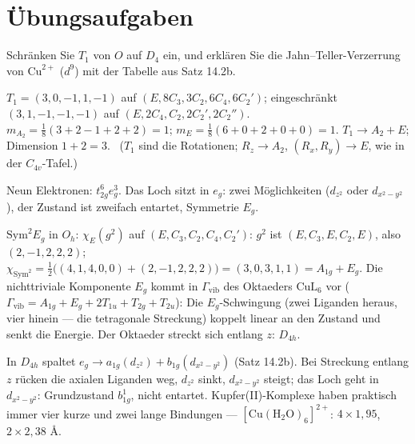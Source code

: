 \section{Übungsaufgaben}

\begin{aufgabe}
Schränken Sie $T_1$ von $O$ auf $D_4$ ein, und erklären Sie die Jahn--Teller-Verzerrung von $\mathrm{Cu}^{2+}$ ($d^{9}$) mit der Tabelle aus Satz 14.2b.

\loesung
{}
$T_1 = (3, 0, -1, 1, -1)$ auf $(E, 8C_3, 3C_2, 6C_4, 6C_2')$; eingeschränkt $(3, 1, -1, -1, -1)$ auf $(E, 2C_4, C_2, 2C_2', 2C_2'')$. $m_{A_2} = \frac18(3 + 2 - 1 + 2 + 2) = 1$; $m_E = \frac18(6 + 0 + 2 + 0 + 0) = 1$. $T_1\to A_2 + E$; Dimension $1 + 2 = 3$. \checkmark\ ($T_1$ sind die Rotationen; $R_z\to A_2$, $(R_x, R_y)\to E$, wie in der $C_{4v}$-Tafel.)

Neun Elektronen: $t_{2g}^{6}e_g^{3}$. Das Loch sitzt in $e_g$: zwei Möglichkeiten ($d_{z^{2}}$ oder $d_{x^{2}-y^{2}}$), der Zustand ist zweifach entartet, Symmetrie $E_g$.

$\mathrm{Sym}^{2}E_g$ in $O_h$: $\chi_E(g^{2})$ auf $(E, C_3, C_2, C_4, C_2')$: $g^{2}$ ist $(E, C_3, E, C_2, E)$, also $(2, -1, 2, 2, 2)$; $\chi_{\mathrm{Sym}^{2}} = \frac12\bigl((4, 1, 4, 0, 0) + (2, -1, 2, 2, 2)\bigr) = (3, 0, 3, 1, 1) = A_{1g} + E_g$. Die nichttriviale Komponente $E_g$ kommt in $\Gamma_{\mathrm{vib}}$ des Oktaeders $\mathrm{CuL_6}$ vor ($\Gamma_{\mathrm{vib}} = A_{1g} + E_g + 2T_{1u} + T_{2g} + T_{2u}$): Die $E_g$-Schwingung (zwei Liganden heraus, vier hinein --- die tetragonale Streckung) koppelt linear an den Zustand und senkt die Energie. Der Oktaeder streckt sich entlang $z$: $D_{4h}$.

In $D_{4h}$ spaltet $e_g\to a_{1g}(d_{z^{2}}) + b_{1g}(d_{x^{2}-y^{2}})$ (Satz 14.2b). Bei Streckung entlang $z$ rücken die axialen Liganden weg, $d_{z^{2}}$ sinkt, $d_{x^{2}-y^{2}}$ steigt; das Loch geht in $d_{x^{2}-y^{2}}$: Grundzustand $b_{1g}^{1}$, nicht entartet. Kupfer(II)-Komplexe haben praktisch immer vier kurze und zwei lange Bindungen --- $[\mathrm{Cu(H_2O)_6}]^{2+}$: $4\times1{,}95$, $2\times2{,}38$ \AA.


\end{aufgabe}
